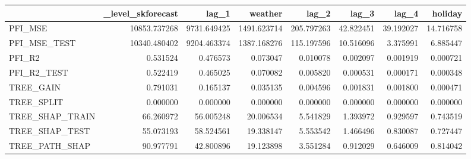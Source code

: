 \begin{tabular}{lrrrrrrr}
\toprule
 & _level_skforecast & lag_1 & weather & lag_2 & lag_3 & lag_4 & holiday \\
\midrule
PFI_MSE & 10853.737268 & 9731.649425 & 1491.623714 & 205.797263 & 42.822451 & 39.192027 & 14.716758 \\
PFI_MSE_TEST & 10340.480402 & 9204.463374 & 1387.168276 & 115.197596 & 10.516096 & 3.375991 & 6.885447 \\
PFI_R2 & 0.531524 & 0.476573 & 0.073047 & 0.010078 & 0.002097 & 0.001919 & 0.000721 \\
PFI_R2_TEST & 0.522419 & 0.465025 & 0.070082 & 0.005820 & 0.000531 & 0.000171 & 0.000348 \\
TREE_GAIN & 0.791031 & 0.165137 & 0.035135 & 0.004596 & 0.001831 & 0.001800 & 0.000471 \\
TREE_SPLIT & 0.000000 & 0.000000 & 0.000000 & 0.000000 & 0.000000 & 0.000000 & 0.000000 \\
TREE_SHAP_TRAIN & 66.260972 & 56.005248 & 20.006534 & 5.541829 & 1.393972 & 0.929597 & 0.743519 \\
TREE_SHAP_TEST & 55.073193 & 58.524561 & 19.338147 & 5.553542 & 1.466496 & 0.830087 & 0.727447 \\
TREE_PATH_SHAP & 90.977791 & 42.800896 & 19.123898 & 3.551284 & 0.912029 & 0.646009 & 0.814042 \\
\bottomrule
\end{tabular}
